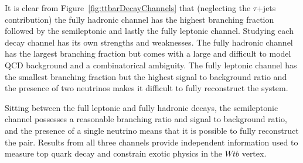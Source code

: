 It is clear from Figure~\ref{fig:ttbarDecayChannels} that (neglecting the $\tau$+jets contribution) the fully hadronic channel has the highest branching fraction followed by the semileptonic and lastly the fully leptonic channel. Studying each decay channel has its own strengths and weaknesses. The fully hadronic channel has the largest branching fraction but comes with a large and difficult to model QCD background and a combinatorical ambiguity. The fully leptonic channel has the smallest branching fraction but the highest signal to background ratio and the presence of two neutrinos makes it difficult to fully reconstruct the \ttbar system. 

Sitting between the full leptonic and fully hadronic decays, the semileptonic channel possesses a reasonable branching ratio and signal to background ratio, and the presence of a single neutrino means that it is possible to fully reconstruct the \ttbar pair. Results from all three channels provide independent information used to measure top quark decay and constrain exotic physics in the $Wtb$ vertex.


